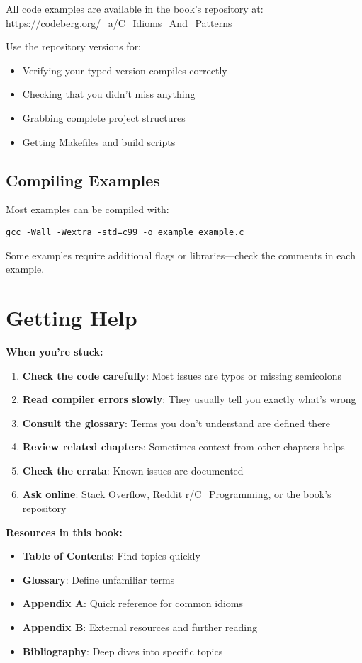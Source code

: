\documentclass[10pt,openany]{book}
\begin{document}
All code examples are available in the book's repository at:
\url{https://codeberg.org/_a/C_Idioms_And_Patterns}

Use the repository versions for:
\begin{itemize}
    \item Verifying your typed version compiles correctly
    \item Checking that you didn't miss anything
    \item Grabbing complete project structures
    \item Getting Makefiles and build scripts
\end{itemize}

\subsection*{Compiling Examples}

Most examples can be compiled with:
\begin{verbatim}
gcc -Wall -Wextra -std=c99 -o example example.c
\end{verbatim}

Some examples require additional flags or libraries—check the comments in each example.

\section*{Getting Help}

\textbf{When you're stuck:}

\begin{enumerate}
    \item \textbf{Check the code carefully}: Most issues are typos or missing semicolons
    \item \textbf{Read compiler errors slowly}: They usually tell you exactly what's wrong
    \item \textbf{Consult the glossary}: Terms you don't understand are defined there
    \item \textbf{Review related chapters}: Sometimes context from other chapters helps
    \item \textbf{Check the errata}: Known issues are documented
    \item \textbf{Ask online}: Stack Overflow, Reddit r/C\_Programming, or the book's repository
\end{enumerate}

\textbf{Resources in this book:}
\begin{itemize}
    \item \textbf{Table of Contents}: Find topics quickly
    \item \textbf{Glossary}: Define unfamiliar terms
    \item \textbf{Appendix A}: Quick reference for common idioms
    \item \textbf{Appendix B}: External resources and further reading
    \item \textbf{Bibliography}: Deep dives into specific topics
\end{itemize}
\end{document}
